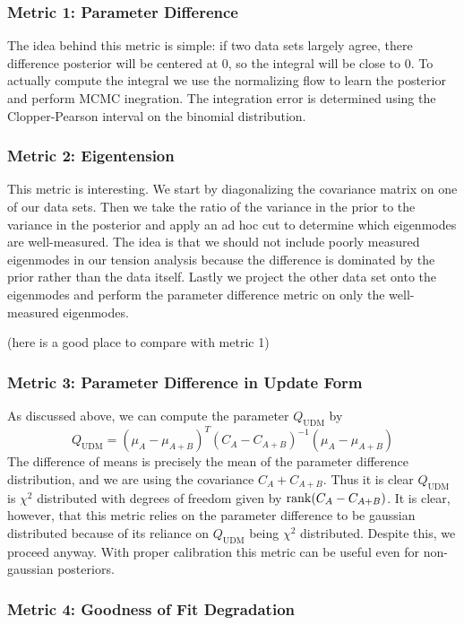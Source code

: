 \subsubsection{Metric 1: Parameter Difference}
The idea behind this metric is simple: if two data sets largely agree, there difference posterior will be centered at 0, so the integral will be close to 0.
To actually compute the integral we use the normalizing flow to learn the posterior and perform MCMC inegration. 
The integration error is determined using the Clopper-Pearson interval on the binomial distribution.

\subsubsection{Metric 2: Eigentension}
This metric is interesting.
We start by diagonalizing the covariance matrix on one of our data sets.
Then we take the ratio of the variance in the prior to the variance in the posterior and apply an ad hoc cut to determine which eigenmodes are well-measured.
The idea is that we should not include poorly measured eigenmodes in our tension analysis because the difference is dominated by the prior rather than the data itself.
Lastly we project the other data set onto the eigenmodes and perform the parameter difference metric on only the well-measured eigenmodes.

(here is a good place to compare with metric 1)

\subsubsection{Metric 3: Parameter Difference in Update Form}
As discussed above, we can compute the parameter $Q_{\mathrm{UDM}}$ by
\begin{equation}
    Q_{\mathrm{UDM}} = {(\mu_A - \mu_{A+B})}^T{(C_A-C_{A+B})}^{-1}(\mu_A - \mu_{A+B}) 
\end{equation}
The difference of means is precisely the mean of the parameter difference distribution, and we are using the covariance $C_A+C_{A+B}$.
Thus it is clear $Q_{\mathrm{UDM}}$ is $\chi^2$ distributed with degrees of freedom given by $\rank(C_A-C_{A+B})$. 
It is clear, however, that this metric relies on the parameter difference to be gaussian distributed because of its reliance on $Q_{\mathrm{UDM}}$ being $\chi^2$ distributed. Despite this, we proceed anyway. With proper calibration this metric can be useful even for non-gaussian posteriors.

\subsubsection{Metric 4: Goodness of Fit Degradation}

